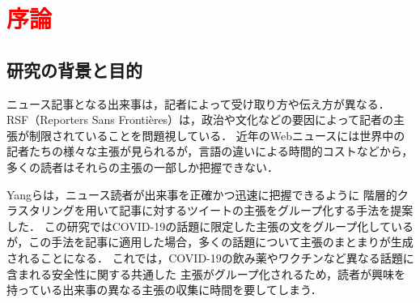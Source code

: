 \documentclass[12pt,a4j]{jreport}
\begin{document}



\chapter{\textcolor{red}{序論}}


\section{研究の背景と目的}

ニュース記事となる出来事は，記者によって受け取り方や伝え方が異なる．
RSF（Reporters Sans Frontières）は，政治や文化などの要因によって記者の主張が制限されていることを問題視している\cite{2021_world_press_freedom_index}．
近年のWebニュースには世界中の記者たちの様々な主張が見られるが，言語の違いによる時間的コストなどから，多くの読者はそれらの主張の一部しか把握できない．

Yangらは，ニュース読者が出来事を正確かつ迅速に把握できるように
階層的クラスタリングを用いて記事に対するツイートの主張をグループ化する手法を提案した\cite{yang_scalable_2021}．
この研究ではCOVID-19の話題に限定した主張の文をグループ化しているが，この手法を記事に適用した場合，多くの話題について主張のまとまりが生成されることになる．
これでは，COVID-19の飲み薬やワクチンなど異なる話題に含まれる安全性に関する共通した
主張がグループ化されるため，読者が興味を持っている出来事の異なる主張の収集に時間を要してしまう．
\end{document}
